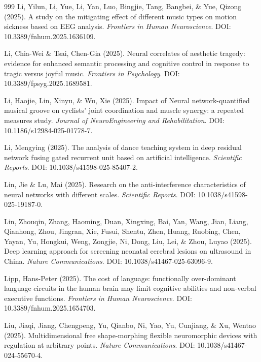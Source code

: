 \documentclass[9pt,onecolumn]{article}
\begin{document}
\begin{thebibliography}{999}
Li, Yilun, Li, Yue, Li, Yan, Luo, Bingjie, Tang, Bangbei, \& Yue, Qizong (2025). A study on the mitigating effect of different music types on motion sickness based on EEG analysis. \textit{Frontiers in Human Neuroscience}. DOI: 10.3389/fnhum.2025.1636109.

Li, Chia-Wei \& Tsai, Chen-Gia (2025). Neural correlates of aesthetic tragedy: evidence for enhanced semantic processing and cognitive control in response to tragic versus joyful music. \textit{Frontiers in Psychology}. DOI: 10.3389/fpsyg.2025.1689581.

Li, Haojie, Lin, Xinyu, \& Wu, Xie (2025). Impact of Neural network-quantified musical groove on cyclists' joint coordination and muscle synergy: a repeated measures study. \textit{Journal of NeuroEngineering and Rehabilitation}. DOI: 10.1186/s12984-025-01778-7.

Li, Mengying (2025). The analysis of dance teaching system in deep residual network fusing gated recurrent unit based on artificial intelligence. \textit{Scientific Reports}. DOI: 10.1038/s41598-025-85407-2.

Lin, Jie \& Lu, Mai (2025). Research on the anti-interference characteristics of neural networks with different scales. \textit{Scientific Reports}. DOI: 10.1038/s41598-025-19187-0.

Lin, Zhouqin, Zhang, Haoming, Duan, Xingxing, Bai, Yan, Wang, Jian, Liang, Qianhong, Zhou, Jingran, Xie, Fusui, Shentu, Zhen, Huang, Ruobing, Chen, Yayan, Yu, Hongkui, Weng, Zongjie, Ni, Dong, Liu, Lei, \& Zhou, Luyao (2025). Deep learning approach for screening neonatal cerebral lesions on ultrasound in China. \textit{Nature Communications}. DOI: 10.1038/s41467-025-63096-9.

Lipp, Hans-Peter (2025). The cost of language: functionally over-dominant language circuits in the human brain may limit cognitive abilities and non-verbal executive functions. \textit{Frontiers in Human Neuroscience}. DOI: 10.3389/fnhum.2025.1654703.

Liu, Jiaqi, Jiang, Chengpeng, Yu, Qianbo, Ni, Yao, Yu, Cunjiang, \& Xu, Wentao (2025). Multidimensional free shape-morphing flexible neuromorphic devices with regulation at arbitrary points. \textit{Nature Communications}. DOI: 10.1038/s41467-024-55670-4.


\end{thebibliography}
\end{document}
